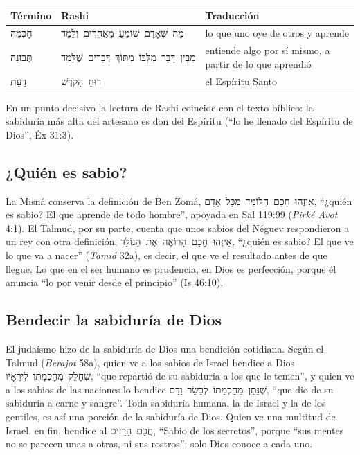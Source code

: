 \documentclass[11pt,letterpaper]{article}
\newcommand{\heb}[1]{\mbox{\foreignlanguage{hebrew}{#1}}}
\begin{document}
\begin{center}\small\renewcommand{\arraystretch}{1.3}
\begin{tabular}{@{}L{2.4cm}L{6.2cm}L{5.8cm}@{}}
\toprule
\textbf{Término} & \textbf{Rashi} & \textbf{Traducción} \\ \midrule
\heb{חָכְמָה} & \heb{מַה שֶּׁאָדָם שׁוֹמֵעַ מֵאֲחֵרִים וְלָמֵד} & lo que uno oye de otros y aprende \\
\heb{תְּבוּנָה} & \heb{מֵבִין דָּבָר מִלִּבּוֹ מִתּוֹךְ דְּבָרִים שֶׁלָּמַד} & entiende algo por sí mismo, a partir de lo que aprendió \\
\heb{דַּעַת} & \heb{רוּחַ הַקֹּדֶשׁ} & el Espíritu Santo \\
\bottomrule
\end{tabular}\end{center}

En un punto decisivo la lectura de Rashi coincide con el texto bíblico: la sabiduría más alta del artesano es don del Espíritu (``lo he llenado del Espíritu de Dios'', Éx 31:3).

\subsection{¿Quién es sabio?}

La Misná conserva la definición de Ben Zomá, \heb{אֵיזֶהוּ חָכָם הַלּוֹמֵד מִכָּל אָדָם}, ``¿quién es sabio? El que aprende de todo hombre'', apoyada en Sal 119:99 (\emph{Pirké Avot} 4:1). El Talmud, por su parte, cuenta que unos sabios del Néguev respondieron a un rey con otra definición, \heb{אֵיזֶהוּ חָכָם הָרוֹאֶה אֶת הַנּוֹלָד}, ``¿quién es sabio? El que ve lo que va a nacer'' (\emph{Tamid} 32a), es decir, el que ve el resultado antes de que llegue. Lo que en el ser humano es prudencia, en Dios es perfección, porque él anuncia ``lo por venir desde el principio'' (Is 46:10).

\subsection{Bendecir la sabiduría de Dios}

El judaísmo hizo de la sabiduría de Dios una bendición cotidiana. Según el Talmud (\emph{Berajot} 58a), quien ve a los sabios de Israel bendice a Dios \heb{שֶׁחָלַק מֵחׇכְמָתוֹ לִירֵאָיו}, ``que repartió de su sabiduría a los que le temen'', y quien ve a los sabios de las naciones lo bendice \heb{שֶׁנָּתַן מֵחׇכְמָתוֹ לְבָשָׂר וָדָם}, ``que dio de su sabiduría a carne y sangre''. Toda sabiduría humana, la de Israel y la de los gentiles, es así una porción de la sabiduría de Dios. Quien ve una multitud de Israel, en fin, bendice al \heb{חֲכַם הָרָזִים}, ``Sabio de los secretos'', porque ``sus mentes no se parecen unas a otras, ni sus rostros'': solo Dios conoce a cada uno.
\end{document}
